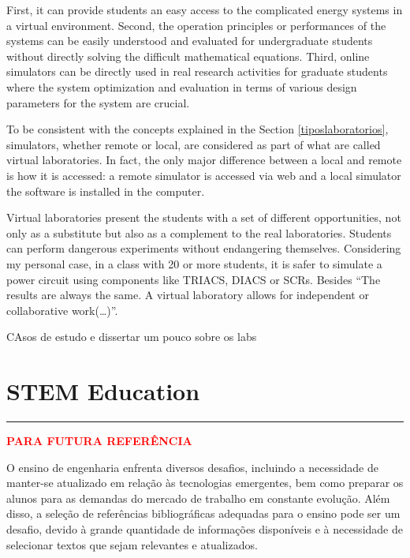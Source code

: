 \vspace{1cm}

First, it can provide students an easy access to the complicated energy systems in a virtual environment. Second, the operation principles or performances of the systems can be easily understood and evaluated for undergraduate students without directly solving the difficult mathematical equations. Third, online simulators can be directly used in real research activities for graduate students where the system optimization and evaluation in terms of various design parameters for the system are crucial.



To be consistent with the concepts explained in the Section \ref{tiposlaboratorios}, simulators, whether remote or local, are considered as part of what are called virtual laboratories.
In fact, the only major difference between a local and remote is how it is accessed: a remote simulator is accessed via web and a local simulator the software is installed in the computer. 


Virtual laboratories present the students with a set of different opportunities, not only as a substitute but also as a complement to the real laboratories. Students can perform dangerous
experiments without endangering themselves. Considering my personal case, in a class with 20 or more students, it is safer to simulate a power circuit using components like TRIACS, DIACS or SCRs. Besides ``The results are always the same. A virtual laboratory allows for independent or collaborative work(\ldots)''\cite{virtuallabng}.

CAsos de estudo e dissertar um pouco sobre os labs

\section {STEM Education}

\vspace{1cm}

\vspace{5pt}
\hrule
\vspace{6pt}

\textcolor{red}{\textbf{PARA FUTURA REFERÊNCIA}}



O ensino de engenharia enfrenta diversos desafios, incluindo a necessidade de manter-se atualizado em relação às tecnologias emergentes, bem como preparar os alunos para as demandas do mercado de trabalho em constante evolução. Além disso, a seleção de referências bibliográficas adequadas para o ensino pode ser um desafio, devido à grande quantidade de informações disponíveis e à necessidade de selecionar textos que sejam relevantes e atualizados.

